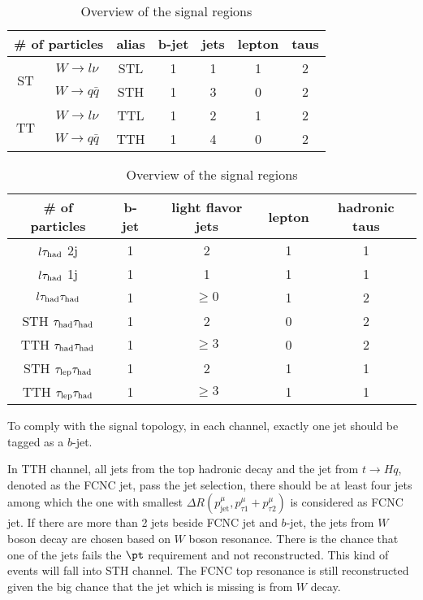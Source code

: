 \begin{table}
\footnotesize
\centering
\caption{Overview of the final states of signal events}
\begin{tabular}[h]{c|c|c|c|c|c|c}
\hline \hline

\multicolumn{2}{c|}{\# of particles}	& alias & b-jet & jets & lepton & taus\\ \hline
\multirow{2}{*}{ST}	& $W\to l\nu$		& STL   & 1	    & 1    & 1      & 2   \\ \cline{2-7}
					& $W\to q\bar{q}$	& STH   & 1	    & 3    & 0      & 2   \\ \hline
\multirow{2}{*}{TT}	& $W\to l\nu$		& TTL   & 1	    & 2    & 1      & 2   \\ \cline{2-7}
					& $W\to q\bar{q}$	& TTH   & 1	    & 4    & 0      & 2   \\ \hline
\end{tabular}
\footnotesize
\centering
\caption{Overview of the signal regions}
\begin{tabular}[h]{c|c|c|c|c}
\hline \hline
\# of particles& b-jet & light flavor jets	& lepton & hadronic taus\\ \hline
$l\tau_\text{had}$ 2j  & 1     & 2					& 1      & 1			\\ \hline
$l\tau_\text{had}$ 1j  & 1     & 1					& 1      & 1			\\ \hline
$l\tau_\text{had}{}\tau_\text{had}$	   & 1     & $\ge0$ 			& 1      & 2            \\ \hline
STH $\tau_\text{had}{}\tau_\text{had}$ & 1     & 2      			& 0      & 2            \\ \hline
TTH $\tau_\text{had}{}\tau_\text{had}$ & 1     & $\ge3$ 			& 0      & 2            \\ \hline
STH $\tau_\text{lep}{}\tau_\text{had}$   & 1     & 2      			& 1      & 1            \\ \hline
TTH $\tau_\text{lep}{}\tau_\text{had}$   & 1     & $\ge3$ 			& 1      & 1            \\ \hline
\end{tabular}
\label{tab:signalevents}
\end{table}

To comply with the signal topology, in each channel, exactly one jet should be tagged as a $b$-jet. 

In TTH channel, all jets from the top hadronic decay and the jet from $t\to Hq$, denoted as the FCNC jet, pass the jet selection, there should be at least four jets among which the one with smallest $\Delta R(p^{\mu}_{\text{jet}},p^{\mu}_{\tau1}+p^{\mu}_{\tau2})$ is considered as FCNC jet. If there are more than 2 jets beside FCNC jet and $b$-jet, the jets from $W$ boson decay are chosen based on $W$ boson resonance. There is the chance that one of the jets fails the $\pt$ requirement and not reconstructed. This kind of events will fall into STH channel. The FCNC top resonance is still reconstructed given the big chance that the jet which is missing is from $W$ decay.

